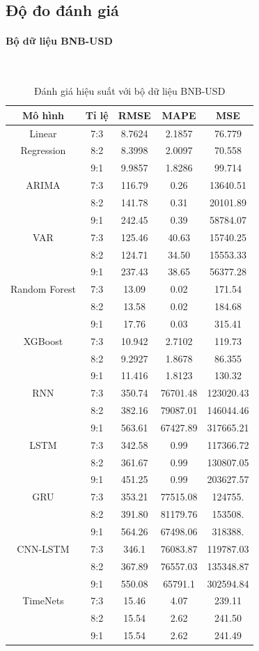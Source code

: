 \documentclass[conference]{IEEEtran}
\begin{document}
\subsection{Độ đo đánh giá}
\paragraph{\textbf{Bộ dữ liệu BNB-USD}} \mbox{} \\
\begin{table}[H]
 \centering
 \caption{Đánh giá hiệu suất với bộ dữ liệu BNB-USD}
\begin{adjustbox}{width=0.4\textwidth}
\begin{tabular}{|c|c|c|c|c|}
\hline
Mô hình & Tỉ lệ & RMSE & MAPE & MSE \\ \hline
Linear & 7:3 & 8.7624 & 2.1857 & 76.779 \\
Regression & 8:2 & 8.3998 & 2.0097 & 70.558 \\
& 9:1 & 9.9857 & 1.8286 & 99.714 \\ \hline
ARIMA & 7:3 & 116.79 & 0.26 & 13640.51 \\
& 8:2 & 141.78 & 0.31 & 20101.89 \\
& 9:1 &  242.45 & 0.39 & 58784.07 \\ \hline
VAR & 7:3 & 125.46 & 40.63 & 15740.25 \\
& 8:2 & 124.71 & 34.50 & 15553.33 \\
& 9:1 & 237.43 & 38.65 & 56377.28 \\ \hline
Random Forest & 7:3 & 13.09 & 0.02 & 171.54 \\
& 8:2 & 13.58 & 0.02 & 184.68 \\
& 9:1 & 17.76 & 0.03 & 315.41 \\ \hline
XGBoost & 7:3 & 10.942 & 2.7102 & 119.73 \\
& 8:2 & 9.2927 & 1.8678 & 86.355 \\
& 9:1 & 11.416 & 1.8123 & 130.32 \\ \hline
RNN & 7:3 & 350.74 & 76701.48 & 123020.43 \\
& 8:2 & 382.16 & 79087.01 & 146044.46 \\
& 9:1 & 563.61 & 67427.89 & 317665.21 \\ \hline
LSTM & 7:3 & 342.58 & 0.99 & 117366.72 \\
& 8:2 & 361.67 & 0.99 & 130807.05 \\
& 9:1 & 451.25 & 0.99 & 203627.57 \\ \hline
GRU & 7:3 & 353.21 & 77515.08 & 124755. \\
& 8:2 & 391.80 & 81179.76 & 153508. \\
& 9:1 & 564.26 & 67498.06 & 318388. \\ \hline
CNN-LSTM & 7:3 & 346.1 & 76083.87 & 119787.03 \\
& 8:2 & 367.89 & 76557.03 & 135348.87 \\
& 9:1 & 550.08 & 65791.1 & 302594.84 \\ \hline
TimeNets & 7:3 & 15.46 & 4.07 & 239.11 \\
& 8:2 & 15.54 & 2.62 & 241.50 \\
& 9:1 & 15.54 & 2.62 & 241.49 \\ \hline


\end{tabular}
\end{adjustbox}
\end{table}
\end{document}
